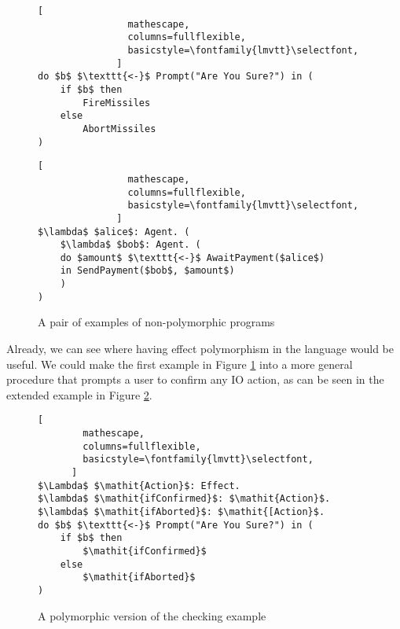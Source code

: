 \documentclass{Report}
\begin{document}
\begin{figure}
    \centering
    \begin{minipage}{0.45\textwidth}
        \begin{framed}
            \begin{lstlisting}[
                mathescape,
                columns=fullflexible,
                basicstyle=\fontfamily{lmvtt}\selectfont,
              ]
do $b$ $\texttt{<-}$ Prompt("Are You Sure?") in (
    if $b$ then
        FireMissiles
    else
        AbortMissiles
)
            \end{lstlisting}        
        \end{framed}
    \end{minipage}
    \quad
    \begin{minipage}{0.45\textwidth}
        \begin{framed}
            \begin{lstlisting}[
                mathescape,
                columns=fullflexible,
                basicstyle=\fontfamily{lmvtt}\selectfont,
              ]
$\lambda$ $alice$: Agent. (
    $\lambda$ $bob$: Agent. (
    do $amount$ $\texttt{<-}$ AwaitPayment($alice$)
    in SendPayment($bob$, $amount$)
    )
)
              \end{lstlisting}
        \end{framed}
    \end{minipage}
    \caption{A pair of examples of non-polymorphic programs}
    \label{CheckExample}
\end{figure}



Already, we can see where having effect polymorphism in the language would be useful. We could make the first example in Figure \ref{CheckExample} into a more general procedure that prompts a user to confirm any IO action, as can be seen in the extended example in Figure \ref{PolymorphicCheckExample}.

\begin{figure}
\begin{framed}
    \begin{lstlisting}[
        mathescape,
        columns=fullflexible,
        basicstyle=\fontfamily{lmvtt}\selectfont,
      ]
$\Lambda$ $\mathit{Action}$: Effect. 
$\lambda$ $\mathit{ifConfirmed}$: $\mathit{Action}$.
$\lambda$ $\mathit{ifAborted}$: $\mathit{[Action}$.
do $b$ $\texttt{<-}$ Prompt("Are You Sure?") in (
    if $b$ then 
        $\mathit{ifConfirmed}$ 
    else
        $\mathit{ifAborted}$
)
    \end{lstlisting}        
\end{framed}
\caption{A polymorphic version of the checking example}
\label{PolymorphicCheckExample}
\end{figure}
\end{document}
